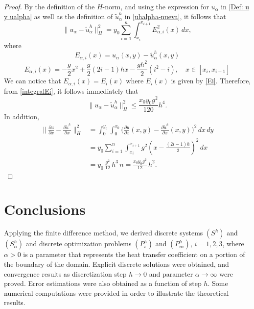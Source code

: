 \documentclass[axioms,article,submit,moreauthors]{Definitions/mdpi}
\newcommand{\dee}{d}
\newcommand\pder[2][]{\ensuremath{\tfrac{\partial#1}{\partial#2}}}
\begin{document}
\begin{proof}
By the definition of the $H$-norm, and using the expression for $u_\alpha$ in \eqref{Def: u y ualpha} as well as the definition of ${\widetilde{u}^h_\alpha}$ in \eqref{uhalpha-nueva}, it follows that
\begin{equation}
\lVert u_\alpha - {\widetilde{u}^h_\alpha} \rVert_H^2 
= y_0 \sum_{i=1}^n \int_{x_i}^{x_{i+1}} E_{\alpha,i}^2(x)\, dx,
\end{equation}
where 
\[
E_{\alpha,i}(x) = u_\alpha(x,y) - {\widetilde{u}^h_\alpha}(x,y) \] \begin{equation}
\label{eq:error_expandido}
E_{\alpha,i}(x)= -\frac{g}{2} x^2 +\frac{ g}{2} \left(2i -1\right) h x  - \frac{g h^2}{2} (i^2 - i), \quad x \in [x_i, x_{i+1}]
\end{equation}
We can notice that $E_{\alpha,i}(x)=E_i(x)$ where $E_i(x)$ is given by \eqref{Ei}. Therefore, from \eqref{integralEi}, it follows immediately that 
\[
\lVert u_\alpha - {\widetilde{u}^h_\alpha} \rVert_H^2 \leq \frac{x_0y_0g^2}{120} h^4. 
\]
In addition,
\begin{equation}\label{norma-derivadaUALPHA-cuadrado}
\begin{aligned}
\bigl\|\pder[u]{x}-\pder[{\widetilde{u}^h}]{x}\bigr\|_{H}^{2}
&= \int_{0}^{y_0}\!\int_{0}^{x_0}
\bigl(\pder[u]{x}(x,y)-\pder[{\widetilde{u}^h}]{x}(x,y)\bigr)^2
\,\dee x\,\dee y \\[1ex]
&= y_0 \sum_{i=1}^{n} \int_{x_i}^{x_{i+1}}
g^2\!\left(x-\frac{(2i-1)h}{2}\right)^2 \,\dee x \\[1ex]
&= y_0\,\frac{g^2}{12}\,h^3\,n
= \frac{x_0 y_0 g^2}{12}\,h^2 .
\end{aligned}
\end{equation}
\end{proof}

  \section{Conclusions}\label{sec8}
  
  

Applying the finite difference method, we derived discrete systems $({S^h})$ and ${(S^h_\alpha)}$ and discrete optimization problems ${(P^h_{i})}$ and ${(P^h_{i\alpha})}$, $i=1,2,3$, where $\alpha>0$ is a parameter that represents the heat transfer coefficient on a portion of the boundary of the domain. Explicit discrete solutions were obtained, and convergence results as discretization step $h \to 0$ and parameter $\alpha \to \infty$ were proved. Error estimations were also obtained as a function of step $h$. Some numerical computations were  provided in order to illustrate the  theoretical results.
\end{document}
